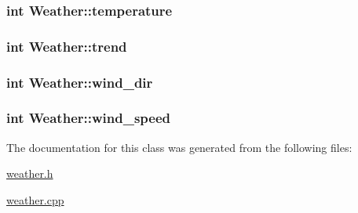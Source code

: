 \hypertarget{classWeather_a9c591d262445fa81b2db1ed42c10243b}{
\subsubsection[{temperature}]{\setlength{\rightskip}{0pt plus 5cm}int Weather\-::temperature}}\label{classWeather_a9c591d262445fa81b2db1ed42c10243b}
\hypertarget{classWeather_aa35eac1fe8923f53dd13deec24b316c4}{
\subsubsection[{trend}]{\setlength{\rightskip}{0pt plus 5cm}int Weather\-::trend}}\label{classWeather_aa35eac1fe8923f53dd13deec24b316c4}
\hypertarget{classWeather_a6954a350137a1f71caf7a497a9151268}{
\subsubsection[{wind\-\_\-dir}]{\setlength{\rightskip}{0pt plus 5cm}int Weather\-::wind\-\_\-dir}}\label{classWeather_a6954a350137a1f71caf7a497a9151268}
\hypertarget{classWeather_a52ed27651f257fccf8781875231bdb6e}{
\subsubsection[{wind\-\_\-speed}]{\setlength{\rightskip}{0pt plus 5cm}int Weather\-::wind\-\_\-speed}}\label{classWeather_a52ed27651f257fccf8781875231bdb6e}


The documentation for this class was generated from the following files\-:\begin{DoxyCompactItemize}
\item 
\hyperlink{weather_8h}{weather.\-h}\item 
\hyperlink{weather_8cpp}{weather.\-cpp}\end{DoxyCompactItemize}
